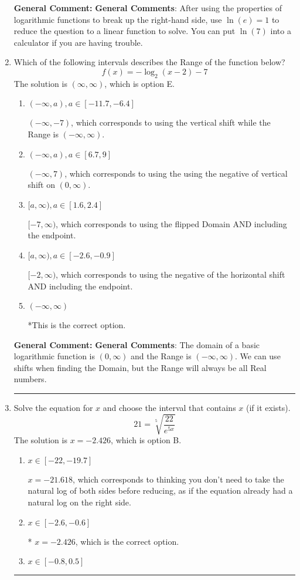 \documentclass{extbook}[14pt]
\newcommand{\litem}[1]{\item #1

\rule{\textwidth}{0.4pt}}
\begin{document}
\begin{enumerate}
{\textbf{General Comment:} \textbf{General Comments}: After using the properties of logarithmic functions to break up the right-hand side, use $\ln(e) = 1$ to reduce the question to a linear function to solve. You can put $\ln(7)$ into a calculator if you are having trouble.
}
\litem{
Which of the following intervals describes the Range of the function below?
\[ f(x) = -\log_2{(x-2)}-7 \]The solution is \( (\infty, \infty) \), which is option E.\begin{enumerate}[label=\Alph*.]
\item \( (-\infty, a), a \in [-11.7, -6.4] \)

$(-\infty, -7)$, which corresponds to using the vertical shift while the Range is $(-\infty, \infty)$.
\item \( (-\infty, a), a \in [6.7, 9] \)

$(-\infty, 7)$, which corresponds to using the using the negative of vertical shift on $(0, \infty)$.
\item \( [a, \infty), a \in [1.6, 2.4] \)

$[-7, \infty)$, which corresponds to using the flipped Domain AND including the endpoint.
\item \( [a, \infty), a \in [-2.6, -0.9] \)

$[-2, \infty)$, which corresponds to using the negative of the horizontal shift AND including the endpoint.
\item \( (-\infty, \infty) \)

*This is the correct option.
\end{enumerate}

\textbf{General Comment:} \textbf{General Comments}: The domain of a basic logarithmic function is $(0, \infty)$ and the Range is $(-\infty, \infty)$. We can use shifts when finding the Domain, but the Range will always be all Real numbers.
}
\litem{
 Solve the equation for $x$ and choose the interval that contains $x$ (if it exists).
\[  21 = \sqrt[5]{\frac{22}{e^{5x}}} \]The solution is \( x = -2.426 \), which is option B.\begin{enumerate}[label=\Alph*.]
\item \( x \in [-22, -19.7] \)

$x = -21.618$, which corresponds to thinking you don't need to take the natural log of both sides before reducing, as if the equation already had a natural log on the right side.
\item \( x \in [-2.6, -0.6] \)

* $x = -2.426$, which is the correct option.
\item \( x \in [-0.8, 0.5] \)


\end{enumerate}}
\end{enumerate}
\end{document}

